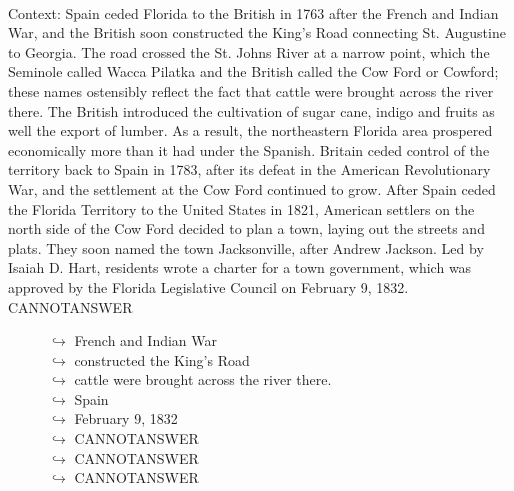 \documentclass[11pt,a4paper, onecolumn]{article}
\begin{document}
\\ Context: Spain ceded Florida to the British in 1763 after the French and Indian War, and the British soon constructed the King's Road connecting St. Augustine to Georgia. The road crossed the St. Johns River at a narrow point, which the Seminole called Wacca Pilatka and the British called the Cow Ford or Cowford; these names ostensibly reflect the fact that cattle were brought across the river there. The British introduced the cultivation of sugar cane, indigo and fruits as well the export of lumber. As a result, the northeastern Florida area prospered economically more than it had under the Spanish. Britain ceded control of the territory back to Spain in 1783, after its defeat in the American Revolutionary War, and the settlement at the Cow Ford continued to grow. After Spain ceded the Florida Territory to the United States in 1821, American settlers on the north side of the Cow Ford decided to plan a town, laying out the streets and plats. They soon named the town Jacksonville, after Andrew Jackson. Led by Isaiah D. Hart, residents wrote a charter for a town government, which was approved by the Florida Legislative Council on February 9, 1832. CANNOTANSWER

\begin{figure}[t] \small \begin{tcolorbox}[boxsep=0pt,left=5pt,right=0pt,top=2pt,colback = yellow!5] \begin{dialogue}
 \small 
\colorbox{pink!25}{$\hookrightarrow$}
{ French and Indian War }
\\
\colorbox{pink!25}{$\hookrightarrow$}
{ constructed the King's Road }
\\
\colorbox{pink!25}{$\hookrightarrow$}
{ cattle were brought across the river there. }
\\
\colorbox{pink!25}{$\hookrightarrow$}
{ Spain }
\\
\colorbox{pink!25}{$\hookrightarrow$}
{ February 9, 1832 }
\\
\colorbox{pink!25}{$\hookrightarrow$}
{ CANNOTANSWER }
\\
\colorbox{pink!25}{$\hookrightarrow$}
{ CANNOTANSWER }
\\
\colorbox{pink!25}{$\hookrightarrow$}
{ CANNOTANSWER }
 \end{dialogue}\end{tcolorbox}\end{figure}
\end{document}
